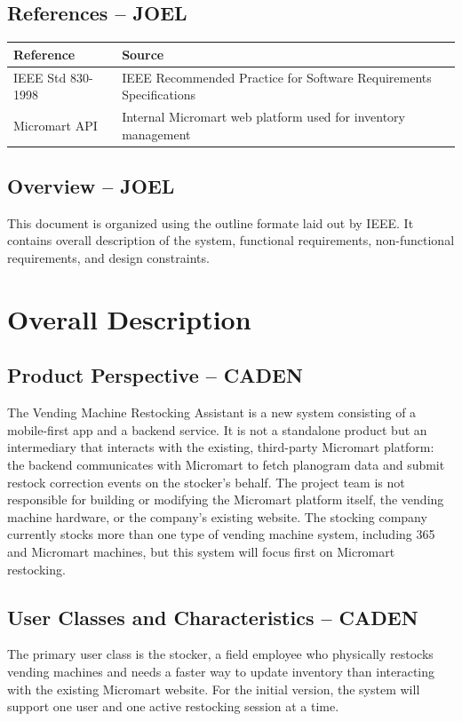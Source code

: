 \documentclass{scrreprt}
\begin{document}
\section{References -- JOEL}
\begin{tabular}{|p{4cm}|p{10cm}|}
\hline
\textbf{Reference} & \textbf{Source} \\
\hline
IEEE Std 830-1998 & IEEE Recommended Practice for Software Requirements Specifications \\
\hline
Micromart API & Internal Micromart web platform used for inventory management \\
\hline
\end{tabular}
\section{Overview -- JOEL}
This document is organized using the outline formate laid out by IEEE. It contains overall description of the system, functional requirements, non-functional requirements, and design constraints.

\chapter{Overall Description}

\section{Product Perspective -- CADEN}
The Vending Machine Restocking Assistant is a new system consisting of a mobile-first app and a backend service. It is not a standalone product but an intermediary that interacts with the existing, third-party Micromart platform: the backend communicates with Micromart to fetch planogram data and submit restock correction events on the stocker's behalf. The project team is not responsible for building or modifying the Micromart platform itself, the vending machine hardware, or the company's existing website. The stocking company currently stocks more than one type of vending machine system, including 365 and Micromart machines, but this system will focus first on Micromart restocking.

\section{User Classes and Characteristics -- CADEN}
The primary user class is the stocker, a field employee who physically restocks vending machines and needs a faster way to update inventory than interacting with the existing Micromart website. For the initial version, the system will support one user and one active restocking session at a time.
\end{document}
